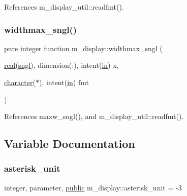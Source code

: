 References m\+\_\+display\+\_\+util\+::readfmt().

\mbox{\label{namespacem__display_a3bb36db16c84ea38d1697191adbc027a}} 
\subsubsection{\texorpdfstring{widthmax\+\_\+sngl()}{widthmax\_sngl()}}
{\footnotesize\ttfamily pure integer function m\+\_\+display\+::widthmax\+\_\+sngl (\begin{DoxyParamCaption}\item[{\hyperlink{read__watch_83_8txt_abdb62bde002f38ef75f810d3a905a823}{real}(\hyperlink{namespacem__display_a2ac86bc535c3ccc5947dbb3109c666b5}{sngl}), dimension(\+:), intent(\hyperlink{M__journal_83_8txt_afce72651d1eed785a2132bee863b2f38}{in})}]{x,  }\item[{\hyperlink{option__stopwatch_83_8txt_abd4b21fbbd175834027b5224bfe97e66}{character}($\ast$), intent(\hyperlink{M__journal_83_8txt_afce72651d1eed785a2132bee863b2f38}{in})}]{fmt }\end{DoxyParamCaption})\hspace{0.3cm}{\ttfamily [private]}}



References maxw\+\_\+sngl(), and m\+\_\+display\+\_\+util\+::readfmt().



\subsection{Variable Documentation}
\mbox{\label{namespacem__display_a9d76146cf157a888cfc94f84a8ec440f}} 
\subsubsection{\texorpdfstring{asterisk\+\_\+unit}{asterisk\_unit}}
{\footnotesize\ttfamily integer, parameter, \hyperlink{M__stopwatch_83_8txt_a2f74811300c361e53b430611a7d1769f}{public} m\+\_\+display\+::asterisk\+\_\+unit = -\/3}

\mbox{\label{namespacem__display_a46d90b75b6ccef7ccade133e5847e815}} 
